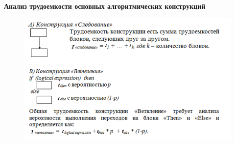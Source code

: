 \documentclass{article}
\begin{document}
\textbf{Анализ трудоемкости основных алгоритмических конструкций}

\begin{figure} [H]
    \includegraphics[width=1\linewidth]{Снимок экрана 2025-04-01 090309.png}
\end{figure}
\end{document}
